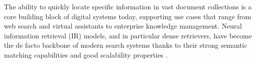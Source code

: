 
The ability to quickly locate specific information in vast document collections is a core building block of digital systems today, supporting use cases that range from web search and virtual assistants to enterprise knowledge management. Neural information retrieval (IR) models, and in particular dense retrievers, have become the de facto backbone of modern search systems thanks to their strong semantic matching capabilities and good scalability properties .  

